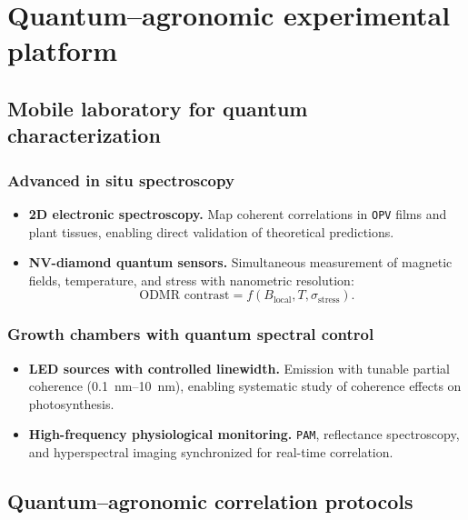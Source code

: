 \documentclass[12pt, a4paper]{article}
\begin{document}
\section{Quantum–agronomic experimental platform}
\label{sec:experimental}

\subsection{Mobile laboratory for quantum characterization}

\subsubsection{Advanced in situ spectroscopy}

\begin{itemize}
    \item \textbf{2D electronic spectroscopy.} Map coherent correlations in \texttt{OPV} films and plant tissues, enabling direct validation of theoretical predictions.
    
    \item \textbf{NV-diamond quantum sensors.} Simultaneous measurement of magnetic fields, temperature, and stress with nanometric resolution:
    \begin{equation}
    \text{ODMR contrast} = f(B_{\text{local}}, T, \sigma_{\text{stress}}).
    \end{equation}
\end{itemize}

\subsubsection{Growth chambers with quantum spectral control}

\begin{itemize}
    \item \textbf{LED sources with controlled linewidth.} Emission with tunable partial coherence (\SIrange{0.1}{10}{\nano\meter}), enabling systematic study of coherence effects on photosynthesis.
    
    \item \textbf{High-frequency physiological monitoring.} \texttt{PAM}, reflectance spectroscopy, and hyperspectral imaging synchronized for real-time correlation.
\end{itemize}

\subsection{Quantum–agronomic correlation protocols}
\end{document}
